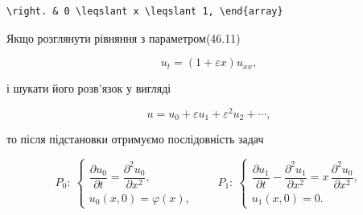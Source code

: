 \documentclass[
  ukrainian,
]{article}
\begin{document}
\begin{verbatim}
\right. & 0 \leqslant x \leqslant 1, \end{array}
\end{verbatim}

Якщо розглянути рівняння з параметром(46.11)

\[
u_t = (1 + \varepsilon x) u_{xx},
\]

і шукати його розв'язок у вигляді

\[
u = u_0 + \varepsilon u_1 + \varepsilon^2 u_2 + \cdots,
\]

то після підстановки отримуємо послідовність задач

\[
P_0:\ \begin{cases}
\dfrac{\partial u_0}{\partial t} = \dfrac{\partial^2 u_0}{\partial x^2}, \\
u_0(x,0) = \varphi(x),
\end{cases}
\qquad P_1:\ \begin{cases}
\dfrac{\partial u_1}{\partial t} - \dfrac{\partial^2 u_1}{\partial x^2} = x\,\dfrac{\partial^2 u_0}{\partial x^2}, \\
u_1(x,0) = 0.
\end{cases}
\]
\end{document}
